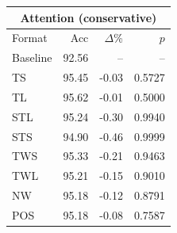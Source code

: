 \begin{tabular}{lrrr}
\toprule
\multicolumn{4}{c}{\textbf{Attention (conservative)}} \\
\midrule
Format & Acc & $\Delta$\% & $p$ \\
\midrule
Baseline & 92.56 & -- & -- \\
\midrule
TS & 95.45 & -0.03 & 0.5727 \\
TL & 95.62 & -0.01 & 0.5000 \\
STL & 95.24 & -0.30 & 0.9940 \\
STS & 94.90 & -0.46 & 0.9999 \\
TWS & 95.33 & -0.21 & 0.9463 \\
TWL & 95.21 & -0.15 & 0.9010 \\
NW & 95.18 & -0.12 & 0.8791 \\
POS & 95.18 & -0.08 & 0.7587 \\
\bottomrule
\end{tabular}